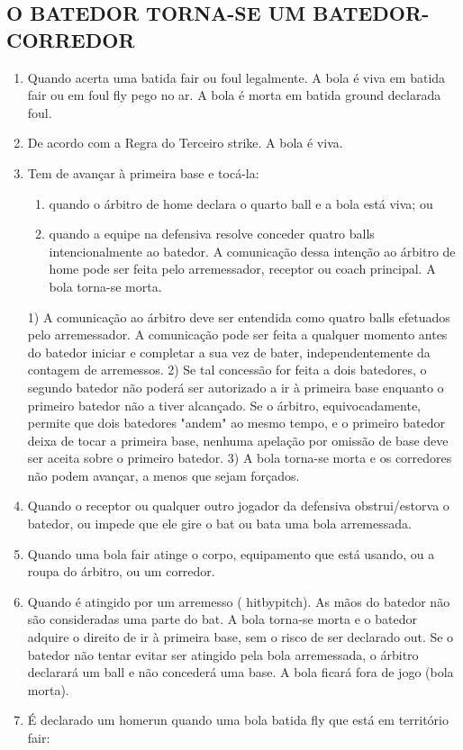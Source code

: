 \subsection{O BATEDOR TORNA-SE UM BATEDOR-CORREDOR}
\begin{enumerate}[label=(\alph*)]
	\item   Quando acerta uma batida \gls{fair} ou \gls{foul} legalmente. A bola é viva em batida \gls{fair} ou em \gls{foul fly} pego no ar. A bola é morta em batida \gls{ground} declarada \gls{foul}.
	\item  De acordo com a Regra do Terceiro \gls{strike}. A bola é viva.
	\item  Tem de avançar à primeira base e tocá-la:

	\begin{enumerate}[label=\roman*.]
		\item quando o árbitro de \gls{home} declara o quarto \gls{ball} e a bola está viva; ou
		\item quando a equipe na defensiva resolve conceder quatro \glspl{ball} intencionalmente ao batedor. A comunicação dessa intenção ao árbitro de
		\gls{home} pode ser feita pelo arremessador, receptor ou \gls{coach} principal. A bola torna-se morta.
	\end{enumerate}

	1) A comunicação ao árbitro deve ser entendida como quatro \glspl{ball} efetuados pelo arremessador. A comunicação pode ser feita a qualquer
	momento antes do batedor iniciar e completar a sua vez de bater, independentemente da contagem de arremessos.
	2) Se tal concessão for feita a dois batedores, o segundo batedor não poderá ser autorizado a ir à primeira base enquanto o primeiro batedor
	não a tiver alcançado. Se o árbitro, equivocadamente, permite que dois batedores "andem" ao mesmo tempo, e o primeiro batedor deixa de tocar
	a primeira base, nenhuma apelação por omissão de base deve ser aceita sobre o primeiro batedor.
	3) A bola torna-se morta e os corredores não podem avançar, a menos  que sejam forçados.

	\item  Quando o receptor ou qualquer outro jogador da defensiva obstrui/estorva o batedor, ou impede que ele gire o \gls{bat} ou bata uma bola arremessada.
	\item  Quando uma bola \gls{fair} atinge o corpo, equipamento que está usando, ou a roupa do árbitro, ou um corredor.
	\item  Quando é atingido por um arremesso ( \gls{hitbypitch}). As mãos do batedor não são consideradas uma parte do \gls{bat}. A bola torna-se morta e o batedor adquire o direito de ir à primeira base, sem o risco de ser declarado \gls{out}. Se o batedor não tentar evitar ser atingido pela bola arremessada, o árbitro declarará um \gls{ball} e não concederá uma base. A bola ficará fora de jogo (bola morta).
	\item   É declarado um \gls{homerun} quando uma bola batida \gls{fly} que está em território \gls{fair}:


\end{enumerate}
